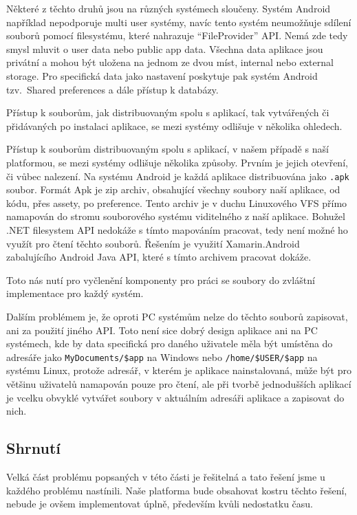 Některé z těchto druhů jsou na různých systémech sloučeny. Systém Android například nepodporuje multi user systémy, navíc tento systém neumožňuje sdílení souborů pomocí filesystému, které nahrazuje ``FileProvider'' API. Nemá zde tedy smysl mluvit o user data nebo public app data.  Všechna data aplikace jsou privátní a mohou být uložena na jednom ze dvou míst, internal nebo external storage. Pro specifická data jako nastavení poskytuje pak systém Android tzv.~Shared preferences a dále přístup k databázy. 


Přístup k souborům, jak distribuovaným spolu s aplikací, tak vytvářených či přidávaných po instalaci aplikace, se mezi systémy odlišuje v několika ohledech.


Přístup k souborům distribuovaným spolu s aplikací, v našem případě s naší platformou, se mezi systémy odlišuje několika způsoby. Prvním je jejich otevření, či vůbec nalezení. Na systému Android je každá aplikace distribuována jako \texttt{.apk} soubor. Formát Apk je zip archiv, obsahující všechny soubory naší aplikace, od kódu, přes assety, po preference. Tento archiv je v duchu Linuxového VFS přímo namapován do stromu souborového systému viditelného z naší aplikace. Bohužel .NET filesystem API nedokáže s tímto mapováním pracovat, tedy není možné ho využít pro čtení těchto souborů. Řešením je využití Xamarin.Android zabalujícího Android Java API, které s tímto archivem pracovat dokáže.

Toto nás nutí pro vyčlenění komponenty pro práci se soubory do zvláštní implementace pro každý systém. 

Dalším problémem je, že oproti PC systémům nelze do těchto souborů zapisovat, ani za použití jiného API. Toto není sice dobrý design aplikace ani na PC systémech, kde by data specifická pro daného uživatele měla být umístěna do adresáře jako \texttt{MyDocuments/\$app} na Windows nebo \texttt{/home/\$USER/\$app} na systému Linux, protože adresář, v kterém je aplikace nainstalovaná, může být pro většinu uživatelů namapován pouze pro čtení, ale při tvorbě jednodušších aplikací je vcelku obvyklé vytvářet soubory v aktuálním adresáři aplikace a zapisovat do nich.


\subsection{Shrnutí}
Velká část problému popsaných v této části je řešitelná a tato řešení jsme u každého problému nastínili. Naše platforma bude obsahovat kostru těchto řešení, nebude je ovšem implementovat úplně, především kvůli nedostatku času. 

